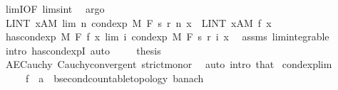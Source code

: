 \begin{isabellebody}
\ limI{\isacharbrackleft}{\kern0pt}OF\ lim{\isacharunderscore}{\kern0pt}s{\isacharunderscore}{\kern0pt}int{\isacharbrackright}{\kern0pt}\ \isamarkupfalse%
\ argo\isanewline
\ \ \ \ \isamarkupfalse%
\ \isamarkupfalse%
\ {\isachardoublequoteopen}LINT\ x{\isacharcolon}{\kern0pt}A{\isacharbar}{\kern0pt}M{\isachardot}{\kern0pt}\ lim\ {\isacharparenleft}{\kern0pt}{\isasymlambda}n{\isachardot}{\kern0pt}\ cond{\isacharunderscore}{\kern0pt}exp\ M\ F\ {\isacharparenleft}{\kern0pt}s\ {\isacharparenleft}{\kern0pt}r\ n{\isacharparenright}{\kern0pt}{\isacharparenright}{\kern0pt}\ x{\isacharparenright}{\kern0pt}\ {\isacharequal}{\kern0pt}\ LINT\ x{\isacharcolon}{\kern0pt}A{\isacharbar}{\kern0pt}M{\isachardot}{\kern0pt}\ f\ x{\isachardoublequoteclose}\ \isacommand{{\isachardot}{\kern0pt}}\isamarkupfalse%
\isanewline
\ \ \isacommand{{\isacharbraceright}{\kern0pt}}\isamarkupfalse%
\isanewline
\ \ \isamarkupfalse%
\ {\isachardoublequoteopen}has{\isacharunderscore}{\kern0pt}cond{\isacharunderscore}{\kern0pt}exp\ M\ F\ f\ {\isacharparenleft}{\kern0pt}{\isasymlambda}x{\isachardot}{\kern0pt}\ lim\ {\isacharparenleft}{\kern0pt}{\isasymlambda}i{\isachardot}{\kern0pt}\ cond{\isacharunderscore}{\kern0pt}exp\ M\ F\ {\isacharparenleft}{\kern0pt}s\ {\isacharparenleft}{\kern0pt}r\ i{\isacharparenright}{\kern0pt}{\isacharparenright}{\kern0pt}\ x{\isacharparenright}{\kern0pt}{\isacharparenright}{\kern0pt}{\isachardoublequoteclose}\ \isamarkupfalse%
\ assms{\isacharparenleft}{\kern0pt}{}{\isacharparenright}{\kern0pt}\ lim{\isacharunderscore}{\kern0pt}integrable\ \isamarkupfalse%
\ {\isacharparenleft}{\kern0pt}intro\ has{\isacharunderscore}{\kern0pt}cond{\isacharunderscore}{\kern0pt}expI{\isacharprime}{\kern0pt}{\isacharcomma}{\kern0pt}\ auto{\isacharparenright}{\kern0pt}\ \isanewline
\ \ \isamarkupfalse%
\ thesis\ \isamarkupfalse%
\ AE{\isacharunderscore}{\kern0pt}Cauchy\ Cauchy{\isacharunderscore}{\kern0pt}convergent\ strict{\isacharunderscore}{\kern0pt}mono{\isacharunderscore}{\kern0pt}r\ \isamarkupfalse%
\ {\isacharparenleft}{\kern0pt}auto\ intro{\isacharbang}{\kern0pt}{\isacharcolon}{\kern0pt}\ that{\isacharparenright}{\kern0pt}\isanewline
{}\isamarkupfalse%
%
\endisatagproof
{\isafoldproof}%
%
\isadelimproof
\isanewline
%
\endisadelimproof
\isanewline
{}\isamarkupfalse%
\ cond{\isacharunderscore}{\kern0pt}exp{\isacharunderscore}{\kern0pt}lim{\isacharcolon}{\kern0pt}\isanewline
\ \ \ \ \ f\ {\isacharcolon}{\kern0pt}{\isacharcolon}{\kern0pt}\ {\isachardoublequoteopen}{\isacharprime}{\kern0pt}a\ {\isasymRightarrow}\ {\isacharprime}{\kern0pt}b{\isacharcolon}{\kern0pt}{\isacharcolon}{\kern0pt}{\isacharbraceleft}{\kern0pt}second{\isacharunderscore}{\kern0pt}countable{\isacharunderscore}{\kern0pt}topology{\isacharcomma}{\kern0pt}\ banach{\isacharbraceright}{\kern0pt}{\isachardoublequoteclose}\isanewline

\end{isabellebody}
